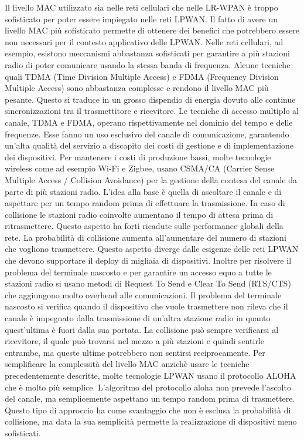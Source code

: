 \documentclass[12pt,a4paper,openright,twoside]{report}
\begin{document}
Il livello MAC utilizzato sia nelle reti cellulari che nelle LR-WPAN \`e troppo sofisticato per poter essere impiegato nelle reti LPWAN. 
Il fatto di avere un livello MAC pi\`u sofisticato permette di ottenere dei benefici che potrebbero essere non necessari per il contesto applicativo delle LPWAN. 
Nelle reti cellulari, ad esempio, esistono meccanismi abbastanza sofisticati per garantire a pi\`u stazioni radio di poter comunicare usando la stessa banda di frequenza. 
Alcune tecniche quali TDMA (Time Division Multiple Access) e FDMA (Frequency Division Multiple Access) sono abbastanza complesse e rendono il livello MAC pi\`u pesante. 
Questo si traduce in un grosso dispendio di energia dovuto alle continue sincronizzazioni tra il trasmettitore e ricevitore. 
Le tecniche di accesso multiplo al canale, TDMA e FDMA,  operano rispettivamente nel dominio del tempo e delle frequenze. 
Esse fanno un uso esclusivo del canale di comunicazione, garantendo un'alta qualit\`a del servizio a discapito dei costi di gestione e di implementazione dei dispositivi.
Per mantenere i costi di produzione bassi, molte tecnologie wireless come ad esempio Wi-Fi e Zigbee, usano CSMA/CA (Carrier Sense Multiple Access / Collision Avoidance) per la gestione della contesa del canale da parte di pi\`u stazioni radio. 
L'idea alla base \`e quella di ascoltare il canale e di aspettare per un tempo random prima di effettuare la trasmissione. 
In caso di collisione le stazioni radio coinvolte aumentano il tempo di attesa prima di ritrasmettere. Questo aspetto ha forti ricadute sulle performance globali della rete.
La probabilit\`a di collisione aumenta all'aumentare del numero di stazioni che vogliono trasmettere. Questo aspetto diverge dalle esigenze delle reti LPWAN che devono supportare   
il deploy di migliaia di dispositivi. 
Inoltre per risolvere il problema del terminale nascosto e per garantire un accesso equo a tutte le stazioni radio si usano metodi di Request To Send e Clear To Send (RTS/CTS) che aggiungono molto overhead alle comunicazioni. 
Il problema del terminale nascosto si verifica quando il dispositivo che vuole trasmettere non rileva che il canale \`e impegnato dalla trasmissione di un'altra stazione radio in quanto  quest'ultima \`e fuori dalla sua portata. 
La collisione pu\`o sempre verificarsi al ricevitore, il quale pu\`o trovarsi nel mezzo a pi\`u stazioni e quindi sentirle entrambe, ma queste ultime potrebbero non sentirsi reciprocamente. 
Per semplificare la complessit\`a del livello MAC anzich\`e usare le tecniche precedentemente descritte, molte tecnologie LPWAN usano il protocollo ALOHA che \`e molto pi\`u semplice. 
L'algoritmo del protocollo aloha non prevede l'ascolto del canale, ma semplicemente aspettano un tempo random prima di trasmettere. 
Questo tipo di approccio ha come svantaggio che non \`e esclusa la probabilit\`a di collisione, ma data la sua semplicit\`a permette la realizzazione di dispositivi meno sofisticati.
\end{document}
